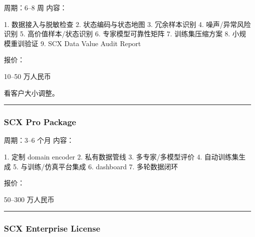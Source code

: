 \documentclass[
  12pt,
]{ctexart}
\newenvironment{Shaded}{}{}
\newcommand{\NormalTok}[1]{#1}
\begin{document}
周期：6--8 周 内容：

\begin{Shaded}
\begin{Highlighting}[]
\NormalTok{1. 数据接入与脱敏检查}
\NormalTok{2. 状态编码与状态地图}
\NormalTok{3. 冗余样本识别}
\NormalTok{4. 噪声/异常风险识别}
\NormalTok{5. 高价值样本/状态识别}
\NormalTok{6. 专家模型可靠性矩阵}
\NormalTok{7. 训练集压缩方案}
\NormalTok{8. 小规模重训验证}
\NormalTok{9. SCX Data Value Audit Report}
\end{Highlighting}
\end{Shaded}

报价：

\begin{Shaded}
\begin{Highlighting}[]
\NormalTok{10–50 万人民币}
\end{Highlighting}
\end{Shaded}

看客户大小调整。

\begin{center}\rule{0.5\linewidth}{0.5pt}\end{center}

\subsubsection{SCX Pro Package}\label{scx-pro-package}

周期：3--6 个月 内容：

\begin{Shaded}
\begin{Highlighting}[]
\NormalTok{1. 定制 domain encoder}
\NormalTok{2. 私有数据管线}
\NormalTok{3. 多专家/多模型评价}
\NormalTok{4. 自动训练集生成}
\NormalTok{5. 与训练/仿真平台集成}
\NormalTok{6. dashboard}
\NormalTok{7. 多轮数据闭环}
\end{Highlighting}
\end{Shaded}

报价：

\begin{Shaded}
\begin{Highlighting}[]
\NormalTok{50–300 万人民币}
\end{Highlighting}
\end{Shaded}

\begin{center}\rule{0.5\linewidth}{0.5pt}\end{center}

\subsubsection{SCX Enterprise License}\label{scx-enterprise-license}
\end{document}
